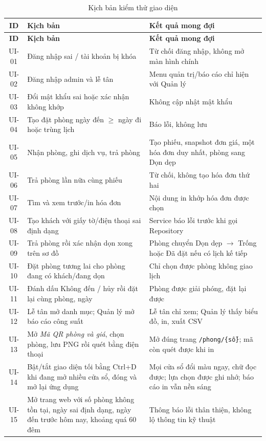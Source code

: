 \documentclass[14pt]{report}
\begin{document}
\begin{longtable}{|c|p{5.5cm}|p{5.3cm}|}
\caption{Kịch bản kiểm thử giao diện}\label{tab:ui-test}\\
\hline
\textbf{ID} & \textbf{Kịch bản} & \textbf{Kết quả mong đợi}\\\hline
\endfirsthead
\hline \textbf{ID} & \textbf{Kịch bản} & \textbf{Kết quả mong đợi}\\\hline
\endhead
UI-01 & Đăng nhập sai / tài khoản bị khóa & Từ chối đăng nhập, không mở màn hình chính \\\hline
UI-02 & Đăng nhập admin và lễ tân & Menu quản trị/báo cáo chỉ hiện với Quản lý \\\hline
UI-03 & Đổi mật khẩu sai hoặc xác nhận không khớp & Không cập nhật mật khẩu \\\hline
UI-04 & Tạo đặt phòng ngày đến $\ge$ ngày đi hoặc trùng lịch & Báo lỗi, không lưu \\\hline
UI-05 & Nhận phòng, ghi dịch vụ, trả phòng & Tạo phiếu, snapshot đơn giá, một hóa đơn duy nhất, phòng sang Dọn dẹp \\\hline
UI-06 & Trả phòng lần nữa cùng phiếu & Từ chối, không tạo hóa đơn thứ hai \\\hline
UI-07 & Tìm và xem trước/in hóa đơn & Nội dung in khớp hóa đơn được chọn \\\hline
UI-08 & Tạo khách với giấy tờ/điện thoại sai định dạng & Service báo lỗi trước khi gọi Repository \\\hline
UI-09 & Trả phòng rồi xác nhận dọn xong trên sơ đồ & Phòng chuyển Dọn dẹp $\to$ Trống hoặc Đã đặt nếu có lịch kế tiếp \\\hline
UI-10 & Đặt phòng tương lai cho phòng đang có khách/đang dọn & Chỉ chọn được phòng không giao lịch \\\hline
UI-11 & Đánh dấu Không đến / hủy rồi đặt lại cùng phòng, ngày & Phòng được giải phóng, đặt lại được \\\hline
UI-12 & Lễ tân mở danh mục; Quản lý mở báo cáo công suất & Lễ tân chỉ xem; Quản lý thấy biểu đồ, in, xuất CSV \\\hline
UI-13 & Mở \textit{Mã QR phòng và giá}, chọn phòng, lưu PNG rồi quét bằng điện thoại & Mở đúng trang \texttt{/phong/\{số\}}; mã còn quét được khi in \\\hline
UI-14 & Bật/tắt giao diện tối bằng Ctrl+D khi đang mở nhiều cửa sổ, đóng và mở lại ứng dụng & Mọi cửa sổ đổi màu ngay, chữ đọc được; lựa chọn được ghi nhớ; báo cáo in vẫn nền sáng \\\hline
UI-15 & Mở trang web với số phòng không tồn tại, ngày sai định dạng, ngày đến trước hôm nay, khoảng quá 60 đêm & Thông báo lỗi thân thiện, không lộ thông tin kỹ thuật \\\hline

\end{longtable}
\end{document}
